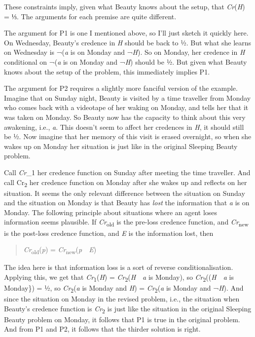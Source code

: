 \documentclass[
  10pt,
  letterpaper,
  DIV=11,
  numbers=noendperiod,
  twoside]{scrartcl}
\begin{document}
These constraints imply, given what Beauty knows about the setup, that
\emph{Cr}(\emph{H}) = ⅓. The arguments for each premise are quite
different.

The argument for P1 is one I mentioned above, so I'll just sketch it
quickly here. On Wednesday, Beauty's credence in \emph{H} should be back
to ½. But what she learns on Wednesday is ¬(\emph{a} is on Monday and
¬\emph{H}). So on Monday, her credence in \emph{H} conditional on
¬(\emph{a} is on Monday and ¬\emph{H}) should be ½. But given what
Beauty knows about the setup of the problem, this immediately implies
P1.

The argument for P2 requires a slightly more fanciful version of the
example. Imagine that on Sunday night, Beauty is visited by a time
traveller from Monday who comes back with a videotape of her waking on
Monday, and tells her that it was taken on Monday. So Beauty now has the
capacity to think about this very awakening, i.e., \emph{a}. This
doesn't seem to affect her credences in \emph{H}, it should still be ½.
Now imagine that her memory of this visit is erased overnight, so when
she wakes up on Monday her situation is just like in the original
Sleeping Beauty problem.

Call \emph{Cr}\_1 her credence function on Sunday after meeting the time
traveller. And call Cr\textsubscript{2} her credence function on Monday
after she wakes up and reflects on her situation. It seems the only
relevant difference between the situation on Sunday and the situation on
Monday is that Beauty has \emph{lost} the information that \emph{a} is
on Monday. The following principle about situations where an agent loses
information seems plausible. If \emph{Cr}\textsubscript{old} is the
pre-loss credence function, and \emph{Cr}\textsubscript{new} is the
post-loss credence function, and \emph{E} is the information lost, then

\begin{quote}
\emph{Cr}\textsubscript{old}(\emph{p}) =
\emph{Cr}\textsubscript{new}(\emph{p}~\textbar~\emph{E})
\end{quote}

The idea here is that information loss is a sort of reverse
conditionalisation. Applying this, we get that
\emph{Cr}\textsubscript{1}(\emph{H}) =
\emph{Cr}\textsubscript{2}(\emph{H}~\textbar~\emph{a} is Monday), so
\emph{Cr}\textsubscript{2}((\emph{H}~\textbar~\emph{a} is Monday\}) = ½,
so \emph{Cr}\textsubscript{2}(\emph{a} is Monday and \emph{H}) =
\emph{Cr}\textsubscript{2}(\emph{a} is Monday and ¬\emph{H}). And since
the situation on Monday in the revised problem, i.e., the situation when
Beauty's credence function is \emph{Cr}\textsubscript{2} is just like
the situation in the original Sleeping Beauty problem on Monday, it
follows that P1 is true in the original problem. And from P1 and P2, it
follows that the thirder solution is right.
\end{document}
